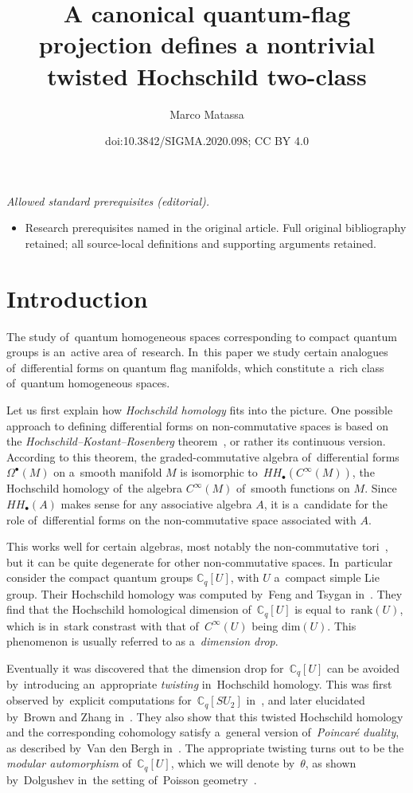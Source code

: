 \documentclass[10pt,a4paper]{amsart}
\title{A canonical quantum-flag projection defines a nontrivial twisted Hochschild two-class}
\author{Marco Matassa}
\date{doi:10.3842/SIGMA.2020.098; CC BY 4.0}
\numberwithin{equation}{section}
\newcommand{\CqU}{\mathbb{C}_q[U]}
\newcommand{\bbC}{\mathbb{C}}
\begin{document}
\maketitle
\noindent\textit{Allowed standard prerequisites (editorial).}\begin{itemize}
\item Research prerequisites named in the original article. Full original bibliography retained; all source-local definitions and supporting arguments retained.
\end{itemize}\medskip
\section{Introduction}

The study of~quantum homogeneous spaces corresponding to compact quantum groups is an~active area of~research.
In~this paper we study certain analogues of~differential forms on quantum flag manifolds, which constitute a~rich class of~quantum homogeneous spaces.

Let us first explain how \emph{Hoch\-schild homology} fits into the picture.
One possible approach to defining differential forms on non-commutative spaces is based on the \emph{Hoch\-schild--Kostant--Rosenberg} theorem~\cite{hkr}, or rather its continuous version. According to this theorem, the graded-commutative algebra of~differential forms $\Omega^\bullet(M)$ on a~smooth manifold $M$ is isomorphic to~$HH_\bullet(C^\infty(M))$, the Hoch\-schild homology of~the algebra $C^\infty(M)$ of~smooth functions on $M$.
Since $HH_\bullet(A)$ makes sense for any associative algebra $A$, it is a~candidate
for the role of~differential forms on the non-commutative space associated with $A$.

This works well for certain algebras, most notably the non-commutative tori~\cite{connes}, but it can be quite degenerate for other non-commutative spaces.
In~particular consider the compact quantum groups $\CqU$, with $U$ a~compact simple Lie group.
Their Hoch\-schild homology was computed by~Feng and Tsygan in~\cite{feng-tsygan}.
They find that the Hoch\-schild homological dimension of~$\CqU$ is equal to~$\mathrm{rank}(U)$, which is in~stark constrast with that of~$C^\infty(U)$ being $\mathrm{dim}(U)$.
This phenomenon is usually referred to as a~\emph{dimension drop}.

Eventually it was discovered that the dimension drop for~$\CqU$ can be avoided by~introducing an~appropriate \emph{twisting} in~Hoch\-schild homology.
This was first observed by~explicit computations for~$\bbC_q[SU_2]$ in~\cite{twisted-su2}, and later elucidated by~Brown and Zhang in~\cite{brzh}.
They also show that this twisted Hoch\-schild homology and the corresponding cohomology satisfy a~general version of~\emph{Poincaré duality}, as described by~Van den Bergh in~\cite{vandenbergh}.
The appropriate twisting turns out to be the \emph{modular automorphism} of~$\CqU$, which we will denote by~$\theta$, as shown by~Dolgushev in~the setting of~Poisson geometry~\cite{dolgushev}.
\end{document}
